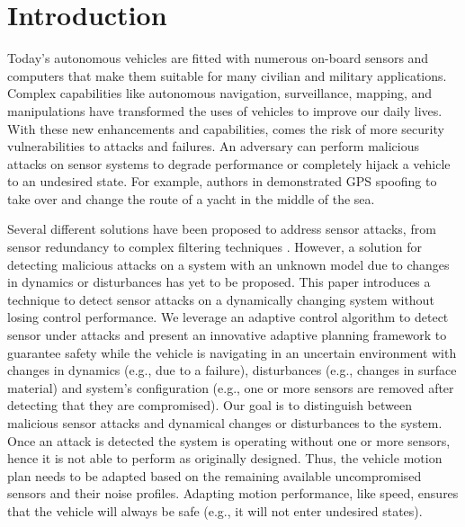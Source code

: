 
\section{Introduction} \label{sec:introduction}

Today's autonomous vehicles are fitted with numerous on-board sensors and computers that make them suitable for many civilian and military applications. Complex capabilities like autonomous navigation, surveillance, mapping, and manipulations have transformed the uses of vehicles to improve our daily lives. 
With these new enhancements and capabilities, comes the risk of more security vulnerabilities to attacks and failures. An adversary can perform malicious attacks on sensor systems to degrade performance or completely hijack a vehicle to an undesired state. For example, authors in \cite{lee} demonstrated GPS spoofing to take over and change the route of a yacht in the middle of the sea.


Several different solutions have been proposed to address sensor attacks, from sensor redundancy to complex filtering techniques \cite{fawzi2014secure,6120187,6943080,7330811}. However, a solution for detecting malicious attacks on a system with an unknown model due to changes in dynamics or disturbances has yet to be proposed. This paper introduces a technique to detect sensor attacks on a dynamically changing system without losing control performance. We leverage an adaptive control algorithm to detect sensor under attacks and present an innovative adaptive planning framework to guarantee safety while the vehicle is navigating in an uncertain environment with changes in dynamics (e.g., due to a failure), disturbances (e.g., changes in surface material) and system's configuration (e.g., one or more sensors are removed after detecting that they are compromised). 
Our goal is to distinguish between malicious sensor attacks and dynamical changes or disturbances to the system. Once an attack is detected the system is operating without one or more sensors, hence it is not able to perform as originally designed.  Thus, the vehicle motion plan needs to be adapted based on the remaining available uncompromised sensors and their noise profiles. Adapting motion performance, like speed, ensures that the vehicle will always be safe (e.g., it will not enter undesired states). 

